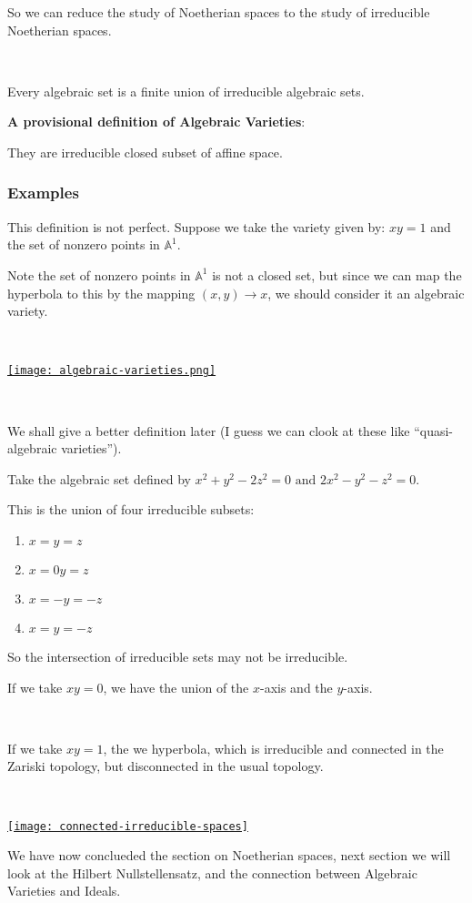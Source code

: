 So we can reduce the study of Noetherian spaces to the study of irreducible Noetherian spaces.


\

\begin{corollary}
    Every algebraic set is a finite union of irreducible algebraic sets.
\end{corollary}

\begin{definition}
    \textbf{A provisional definition of Algebraic Varieties}:
    
    They are irreducible closed subset of affine space.
\end{definition}

\subsubsection{Examples}

\begin{example}
  This definition is not perfect. Suppose we take the variety given by: $xy=1$ and the set of nonzero points in $\mathbb{A}^1$.

Note the set of nonzero points in $\mathbb{A}^1$ is not a closed set, but since we can map the hyperbola to this by the mapping $(x,y)\rightarrow x$, we should consider it an algebraic variety.

\

\href{https://youtu.be/D_eJ8BWLb24?t=1110}{\texttt{[image: algebraic-varieties.png]}}

\

We shall give a better definition later (I guess we can clook at these like ``quasi-algebraic varieties'').
\end{example}

\begin{example}
    Take the algebraic set defined by $x^2+y^2 - 2z^2 = 0 \text{ and }2x^2-y^2-z^2 = 0$.

    This is the union of four irreducible subsets:\begin{enumerate}
        \item $x=y=z$
        \item $x=0y=z$
        \item $x=-y=-z$
        \item $x=y=-z$
    \end{enumerate}

    So the intersection of irreducible sets may not be irreducible.
\end{example}
\newpage 
\begin{example}
    If we take $xy=0$, we have the union of the $x$-axis and the $y$-axis.

    \

    If we take $xy=1$, the we hyperbola, which is irreducible and connected in the Zariski topology, but disconnected in the usual topology.

    \

\href{https://youtu.be/D_eJ8BWLb24?t=1295}{\texttt{[image: connected-irreducible-spaces]}}

\end{example}

We have now conclueded the section on Noetherian spaces, next section we will look at the Hilbert Nullstellensatz, and the connection between Algebraic Varieties and Ideals.


